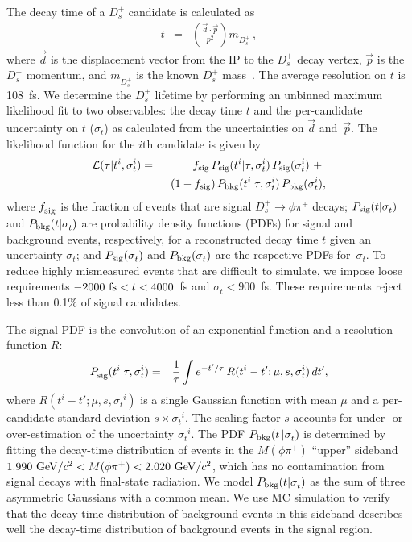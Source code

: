 \documentclass[aps,prl,twocolumn,superscriptaddress,showpacs,preprintnumbers,amsmath,amssymb]{revtex4-2}
\def\ra{\!\rightarrow\!}
\def\Dsphipi{D^+_s\ra\phi\pi^+}
\def\sigmat{\sigma^{}_t}
\def\trec {t}
\begin{document}
The decay time of a $D_s^+$ candidate is calculated as
\begin{eqnarray}
\trec & = & \left(\frac{\vec{d}\cdot\vec{p}}{p^2}\right) m^{}_{D_s^+} \,,
\label{eqn:decay_time}
\end{eqnarray}
where $\vec{d}$ is the displacement vector from the IP to the $D_s^+$
decay vertex, $\vec{p}$ is the $D_s^+$ momentum, and $m^{}_{D_s^+}$ is the
known $D_s^+$ mass~\cite{ParticleDataGroup:2022pth}.
The average resolution on $\trec$ is 108~fs.
We determine the $D^+_s$ lifetime by performing an unbinned maximum 
likelihood fit to two observables: the decay time $\trec$ and the 
per-candidate uncertainty on $\trec$ ($\sigmat$)
as calculated from the uncertainties on $\vec{d}$ and~$\vec{p}$.
The likelihood function for the $i$th candidate is given by
\begin{eqnarray} \label{eqn:likelihood_lftm}
{\cal L}(\tau | t^i,\sigmat{}\!\!^i) & = & 
f_{\rm sig}\,P_{\rm{sig}}(t^i | \tau, \sigmat{}\!\!^i)\,P_{\rm{sig}}(\sigmat{}\!\!^i)\ +\   
\nonumber \\
 & & \hskip 0.08in
(1-f_{\rm{sig}})\,P_{\rm{bkg}}(t^i|\tau, \sigmat{}\!\!^i)\,P_{\rm{bkg}}(\sigmat{}\!\!^i) ,
\end{eqnarray}
where $f^{}_{\rm sig}$ is the fraction of events that are signal $\Dsphipi$ decays;
$P_{\rm sig}(t | \sigmat)$ and $P_{\rm bkg}(t | \sigmat)$ are probability density 
functions (PDFs) for signal and background events, respectively, for a 
reconstructed decay time $\trec$ given an uncertainty $\sigmat$; 
and $P_{\rm sig}(\sigmat)$ and 
$P_{\rm bkg}(\sigmat)$ are the respective PDFs for~$\sigmat$. To reduce 
highly mismeasured events that are difficult to simulate, we impose loose 
requirements $-2000~{\rm fs}< \trec <4000$~fs and $\sigma^{}_t<900$~fs.
These requirements reject less than 0.1\% of signal candidates.


The signal PDF is the convolution of an exponential function
and a resolution function $R$:
\begin{eqnarray}
P^{}_{\rm sig}(t^i|\tau, \sigmat{}\!\!^i)  
& = & \frac{1}{\tau} \int e^{-t'/\tau}\,R(t^i-t' ; \mu, s, \sigmat{}\!\!^i)\,dt' ,
\label{lftm_pdf}
\end{eqnarray}
where $R(t^i-t' ; \mu, s, \sigmat{}\!\!^i)$ is a single Gaussian function
with mean $\mu$ and a per-candidate standard deviation $s\times \sigmat{}\!\!^i$. 
The scaling factor $s$ accounts for under- or over-estimation of the 
uncertainty $\sigmat{}\!\!^i$. The PDF $P_{\rm bkg}(t\,|\sigmat)$ is determined 
by fitting the decay-time distribution of events in the 
$M(\phi\pi^+)$ ``upper'' sideband 
$1.990~{\rm GeV}/c^2 < M(\phi\pi^+) <2.020~{\rm GeV}/c^2$,
which has no contamination from signal decays with final-state radiation.
We model $P_{\rm bkg}(t|\sigmat)$ as the sum of three asymmetric Gaussians with a common mean. 
We use MC simulation to verify that the decay-time distribution of background events in this
sideband describes well the decay-time distribution of background events in the signal region.
\end{document}
